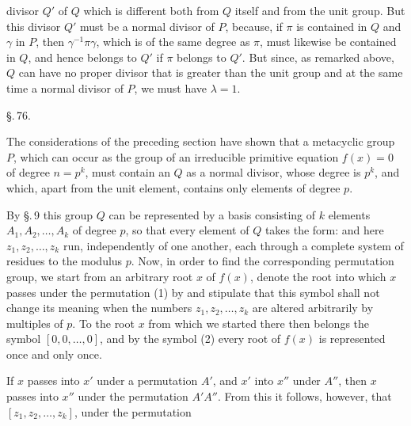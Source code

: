 divisor $Q'$ of $Q$ which is different both from $Q$ itself and from the unit group. But this divisor $Q'$ must be a normal divisor of $P$, because, if $\pi$ is contained in $Q$ and $\gamma$ in $P$, then $\gamma^{-1}\pi\gamma$, which is of the same degree as $\pi$, must likewise be contained in $Q$, and hence belongs to $Q'$ if $\pi$ belongs to $Q'$. But since, as remarked above, $Q$ can have no proper divisor that is greater than the unit group and at the same time a normal divisor of $P$, we must have $\lambda = 1$.

\begin{center}
\S.\,76.\\
\end{center}

The considerations of the preceding section have shown that a metacyclic group $P$, which can occur as the  group of an irreducible primitive equation $f(x) = 0$ of degree $n = p^k$, must contain an  $Q$ as a normal divisor, whose degree is $p^k$, and which, apart from the unit element, contains only elements of degree $p$.

By \S.\,9 this group $Q$ can be represented by a basis consisting of $k$ elements $A_1, A_2, \ldots, A_k$ of degree $p$, so that every element of $Q$ takes the form:
and here $z_1, z_2, \ldots, z_k$ run, independently of one another, each through a complete system of residues to the modulus $p$. Now, in order to find the corresponding permutation group, we start from an arbitrary root $x$ of $f(x)$, denote the root into which $x$ passes under the permutation (1) by
and stipulate that this symbol shall not change its meaning when the numbers $z_1, z_2, \ldots, z_k$ are altered arbitrarily by multiples of $p$. To the root $x$ from which we started there then belongs the symbol $[0, 0, \ldots, 0]$, and by the symbol (2) every root of $f(x)$ is represented once and only once.

If $x$ passes into $x'$ under a permutation $A'$, and $x'$ into $x''$ under $A''$, then $x$ passes into $x''$ under the permutation $A' A''$. From this it follows, however, that $[z_1, z_2, \ldots, z_k]$, under the permutation
